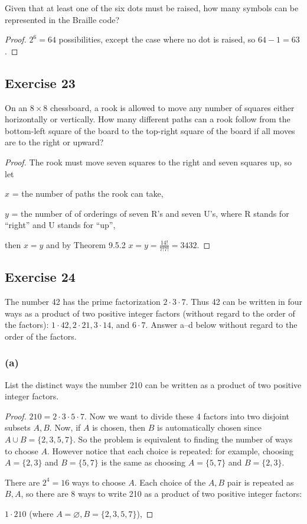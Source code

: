 \documentclass[14pt]{extarticle}
\newcommand{\es}{\varnothing}
\begin{document}
Given that at least one of the six dots must be raised, how many symbols can be represented in the Braille code?

\begin{proof}
\(2^6 = 64\) possibilities, except the case where no dot is raised, so \(64-1=63\).
\end{proof}

\subsection{Exercise 23}
On an \(8 \times 8\) chessboard, a rook is allowed to move any number of squares either horizontally or vertically. 
How many different paths can a rook follow from the bottom-left square of the board to the top-right square of the 
board if all moves are to the right or upward?

\begin{proof}
The rook must move seven squares to the right and seven squares up, so let 

\(x\) = the number of paths the rook can take,

\(y\) =  the number of of orderings of seven R’s and seven U’s, where R stands for “right” and U stands for “up”,

then \(x = y\) and by Theorem 9.5.2 \(x = y = \frac{14!}{7!7!} = 3432\).
\end{proof}

\subsection{Exercise 24}
The number 42 has the prime factorization \(2 \cdot 3 \cdot 7\). Thus 42 can be written in four ways as a product of 
two positive integer factors (without regard to the order of the factors): \(1 \cdot 42, 2 \cdot 21, 3 \cdot 14\), 
and \(6 \cdot 7\). Answer a–d below without regard to the order of the factors.

\subsubsection{(a)}
List the distinct ways the number 210 can be written as a product of two positive integer factors.

\begin{proof}
\(210 = 2 \cdot 3 \cdot 5 \cdot 7\). Now we want to divide these 4 factors into two disjoint subsets \(A, B\). Now, if 
\(A\) is chosen, then \(B\) is automatically chosen since \(A \cup B = \{2,3,5,7\}\). So the problem is equivalent to 
finding the number of ways to choose \(A\). However notice that each choice is repeated: for example, choosing \(A = \{ 
2,3\}\) and \(B = \{5,7\}\) is the same as choosing \(A = \{ 5,7\}\) and \(B = \{2,3\}\).

There are \(2^4 = 16\) ways to choose \(A\). Each choice of the \(A,B\) pair is repeated as \(B,A\), so there are 8 ways
to write 210 as a product of two positive integer factors: 

\(1 \cdot 210\) (where \(A = \es, B = \{2,3,5,7\}\)),
\end{proof}
\end{document}
